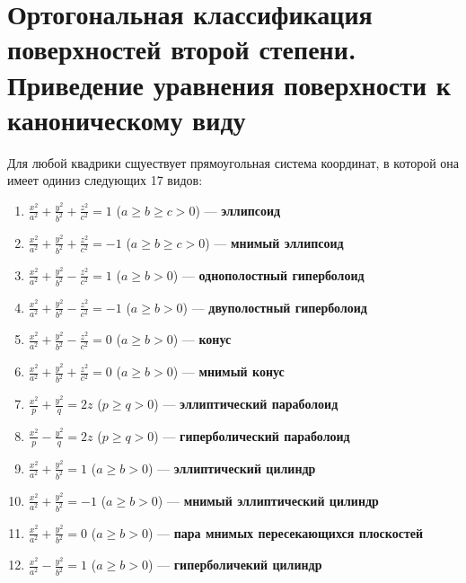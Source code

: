 \section{Ортогональная классификация поверхностей второй степени. Приведение уравнения поверхности к каноническому виду}

\begin{theorem}
    Для любой квадрики сщуествует прямоугольная система координат, в которой она имеет одиниз следующих 17 видов:
    \begin{enumerate}
        \item $\displaystyle\frac{x^2}{a^2} + \frac{y^2}{b^2} + \frac{z^2}{c^2} = 1$ ($a \geqslant b \geqslant c > 0$) --- \textbf{эллипсоид}
        \item $\displaystyle\frac{x^2}{a^2} + \frac{y^2}{b^2} + \frac{z^2}{c^2} = -1$ ($a \geqslant b \geqslant c > 0$) --- \textbf{мнимый эллипсоид}
        \item $\displaystyle\frac{x^2}{a^2} + \frac{y^2}{b^2} - \frac{z^2}{c^2} = 1$ ($a \geqslant b > 0$) --- \textbf{однополостный гиперболоид}
        \item $\displaystyle\frac{x^2}{a^2} + \frac{y^2}{b^2} - \frac{z^2}{c^2} = -1$ ($a \geqslant b > 0$) --- \textbf{двуполостный гиперболоид}
        \item $\displaystyle\frac{x^2}{a^2} + \frac{y^2}{b^2} - \frac{z^2}{c^2} = 0$ ($a \geqslant b > 0$) --- \textbf{конус}
        \item $\displaystyle\frac{x^2}{a^2} + \frac{y^2}{b^2} + \frac{z^2}{c^2} = 0$ ($a \geqslant b > 0$) --- \textbf{мнимый конус}
        \item $\displaystyle\frac{x^2}{p} + \frac{y^2}{q} = 2z$ ($p \geqslant q > 0$) --- \textbf{эллиптический параболоид}
        \item $\displaystyle\frac{x^2}{p} - \frac{y^2}{q} = 2z$ ($p \geqslant q > 0$) --- \textbf{гиперболический параболоид}
        \item $\displaystyle\frac{x^2}{a^2} + \frac{y^2}{b^2} = 1$ ($a \geqslant b > 0$) --- \textbf{эллиптический цилиндр}
        \item $\displaystyle\frac{x^2}{a^2} + \frac{y^2}{b^2} = -1$ ($a \geqslant b > 0$) --- \textbf{мнимый эллиптический цилиндр}
        \item $\displaystyle\frac{x^2}{a^2} + \frac{y^2}{b^2} = 0$ ($a \geqslant b > 0$) --- \textbf{пара мнимых пересекающихся плоскостей}
        \item $\displaystyle\frac{x^2}{a^2} - \frac{y^2}{b^2} = 1$ ($a \geqslant b > 0$) --- \textbf{гиперболичекий цилиндр}

\end{enumerate}
\end{theorem}
